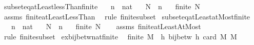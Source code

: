 \begin{isabellebody}
\endisatagproof
{\isafoldproof}%
%
\isadelimproof
\isanewline
%
\endisadelimproof
\isanewline
{}\isamarkupfalse%
\ subset{\isacharunderscore}{\kern0pt}eq{\isacharunderscore}{\kern0pt}atLeast{}{\isacharunderscore}{\kern0pt}lessThan{\isacharunderscore}{\kern0pt}finite{\isacharcolon}{\kern0pt}\isanewline
\ \ \ n\ {\isacharcolon}{\kern0pt}{\isacharcolon}{\kern0pt}\ nat\isanewline
\ \ \ {\isachardoublequoteopen}N\ {\isasymsubseteq}\ {\isacharbraceleft}{\kern0pt}{}{\isachardot}{\kern0pt}{\isachardot}{\kern0pt}{\isacharless}{\kern0pt}n{\isacharbraceright}{\kern0pt}{\isachardoublequoteclose}\isanewline
\ \ \ {\isachardoublequoteopen}finite\ N{\isachardoublequoteclose}\isanewline
%
\isadelimproof
\ \ %
\endisadelimproof
%
\isatagproof
{}\isamarkupfalse%
\ assms\ finite{\isacharunderscore}{\kern0pt}atLeastLessThan\ \isamarkupfalse%
\ {\isacharparenleft}{\kern0pt}rule\ finite{\isacharunderscore}{\kern0pt}subset{\isacharparenright}{\kern0pt}%
\endisatagproof
{\isafoldproof}%
%
\isadelimproof
\isanewline
%
\endisadelimproof
\isanewline
{}\isamarkupfalse%
\ subset{\isacharunderscore}{\kern0pt}eq{\isacharunderscore}{\kern0pt}atLeast{}{\isacharunderscore}{\kern0pt}atMost{\isacharunderscore}{\kern0pt}finite{\isacharcolon}{\kern0pt}\isanewline
\ \ \ n\ {\isacharcolon}{\kern0pt}{\isacharcolon}{\kern0pt}\ nat\isanewline
\ \ \ {\isachardoublequoteopen}N\ {\isasymsubseteq}\ {\isacharbraceleft}{\kern0pt}{}{\isachardot}{\kern0pt}{\isachardot}{\kern0pt}n{\isacharbraceright}{\kern0pt}{\isachardoublequoteclose}\isanewline
\ \ \ {\isachardoublequoteopen}finite\ N{\isachardoublequoteclose}\isanewline
%
\isadelimproof
\ \ %
\endisadelimproof
%
\isatagproof
{}\isamarkupfalse%
\ assms\ finite{\isacharunderscore}{\kern0pt}atLeastAtMost\ \isamarkupfalse%
\ {\isacharparenleft}{\kern0pt}rule\ finite{\isacharunderscore}{\kern0pt}subset{\isacharparenright}{\kern0pt}%
\endisatagproof
{\isafoldproof}%
%
\isadelimproof
\isanewline
%
\endisadelimproof
\isanewline
{}\isamarkupfalse%
\ ex{\isacharunderscore}{\kern0pt}bij{\isacharunderscore}{\kern0pt}betw{\isacharunderscore}{\kern0pt}nat{\isacharunderscore}{\kern0pt}finite{\isacharcolon}{\kern0pt}\isanewline
\ \ {\isachardoublequoteopen}finite\ M\ {\isasymLongrightarrow}\ {\isasymexists}h{\isachardot}{\kern0pt}\ bij{\isacharunderscore}{\kern0pt}betw\ h\ {\isacharbraceleft}{\kern0pt}{}{\isachardot}{\kern0pt}{\isachardot}{\kern0pt}{\isacharless}{\kern0pt}card\ M{\isacharbraceright}{\kern0pt}\ M{\isachardoublequoteclose}\isanewline

\end{isabellebody}
